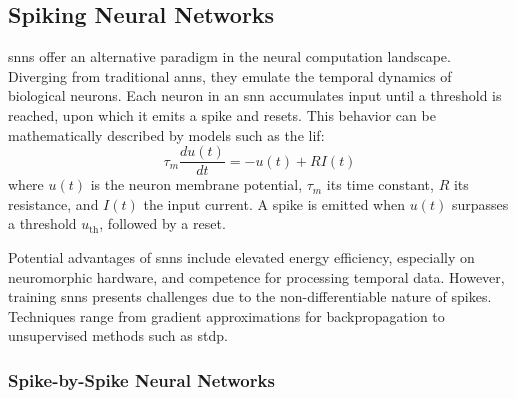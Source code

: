 \subsection{Spiking Neural Networks}

\glspl{snn} offer an alternative paradigm in the neural computation landscape. Diverging from traditional \glspl{ann}, they emulate the temporal dynamics of biological neurons. Each neuron in an \gls{snn} accumulates input until a threshold is reached, upon which it emits a spike and resets. This behavior can be mathematically described by models such as the \gls{lif}:
\begin{equation}
\tau_m \frac{du(t)}{dt} = -u(t) + RI(t)
\end{equation}
where \( u(t) \) is the neuron membrane potential, \( \tau_m \) its time constant, \( R \) its resistance, and \( I(t) \) the input current. A spike is emitted when \( u(t) \) surpasses a threshold \( u_{\text{th}} \), followed by a reset.

Potential advantages of \glspl{snn} include elevated energy efficiency, especially on neuromorphic hardware, and competence for processing temporal data. However, training \glspl{snn} presents challenges due to the non-differentiable nature of spikes. Techniques range from gradient approximations for backpropagation to unsupervised methods such as \gls{stdp}.

\subsubsection{Spike-by-Spike Neural Networks} 

\label{sec:sbs}


